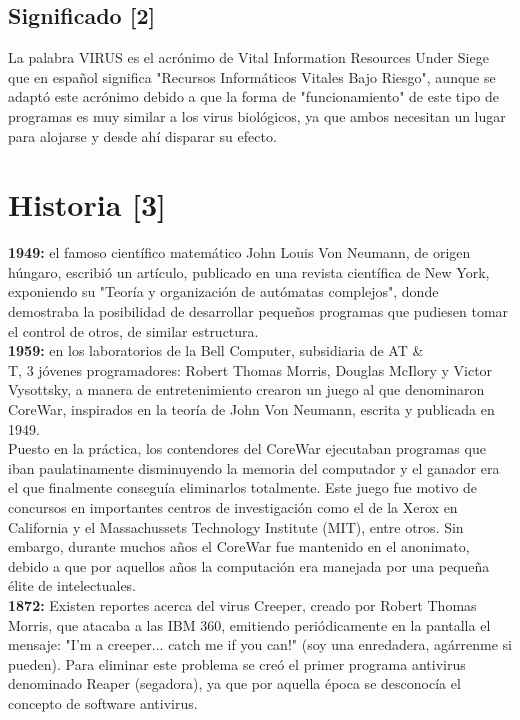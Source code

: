 \documentclass[12pt,a4paper]{article}
\begin{document}
	\subsection{Significado [2]}
	
	La palabra VIRUS es el acrónimo de Vital Information Resources Under Siege que en español significa "Recursos Informáticos Vitales Bajo Riesgo", aunque se adaptó este acrónimo debido a que la forma de "funcionamiento" de este tipo de programas es muy similar a los virus biológicos, ya que ambos necesitan un lugar para alojarse y desde ahí disparar su efecto.
	
	\section{Historia [3]}
	
	\textbf{1949:} el famoso científico matemático John Louis Von Neumann, de origen húngaro, escribió un artículo, publicado en una revista científica de New York, exponiendo su "Teoría y organización de autómatas complejos", donde demostraba la posibilidad de desarrollar pequeños programas que pudiesen tomar el control de otros, de similar estructura.\\
	
	\textbf{1959:} en los laboratorios de la Bell Computer, subsidiaria de AT \& \\T, 3 jóvenes programadores: Robert Thomas Morris, Douglas McIlory y Victor Vysottsky, a manera de entretenimiento crearon un juego al que denominaron CoreWar, inspirados en la teoría de John Von Neumann, escrita y publicada en 1949.\\
	
	Puesto en la práctica, los contendores del CoreWar ejecutaban programas que iban paulatinamente disminuyendo la memoria del computador y el ganador era el que finalmente conseguía eliminarlos totalmente. Este juego fue motivo de concursos en importantes centros de investigación como el de la Xerox en California y el Massachussets Technology Institute (MIT), entre otros.
	Sin embargo, durante muchos años el CoreWar fue mantenido en el anonimato, debido a que por aquellos años la computación era manejada por una pequeña élite de intelectuales.\\
	
	\textbf{1872: }Existen reportes acerca del virus Creeper, creado por Robert Thomas Morris, que atacaba a las IBM 360, emitiendo periódicamente en la pantalla el mensaje: "I'm a creeper... catch me if you can!" (soy una enredadera, agárrenme si pueden). Para eliminar este problema se creó el primer programa antivirus denominado Reaper (segadora), ya que por aquella época se desconocía el concepto de software antivirus.\\
	
\end{document}

